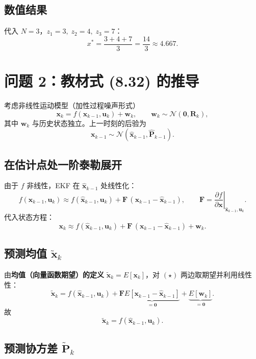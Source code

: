 \documentclass[12pt]{article}
\begin{document}
\subsection*{数值结果}

代入 $N=3$，$z_1=3,\;z_2=4,\;z_3=7$：
\[
\boxed{\;x^{*}=\frac{3+4+7}{3}=\frac{14}{3}\approx 4.667.\;}
\]

\newpage
\section*{问题 2：教材式 (8.32) 的推导}

考虑非线性运动模型（加性过程噪声形式）
\[
\mathbf{x}_k=f(\mathbf{x}_{k-1},\mathbf{u}_k)+\mathbf{w}_k,
\qquad \mathbf{w}_k\sim\mathcal{N}(\mathbf{0},\mathbf{R}_k),
\]
其中 $\mathbf{w}_k$ 与历史状态独立。上一时刻的后验为
\[
\mathbf{x}_{k-1}\sim\mathcal{N}(\hat{\mathbf{x}}_{k-1},\hat{\mathbf{P}}_{k-1}).
\]

\subsection*{在估计点处一阶泰勒展开}

由于 $f$ 非线性，EKF 在 $\hat{\mathbf{x}}_{k-1}$ 处线性化：
\[
f(\mathbf{x}_{k-1},\mathbf{u}_k)\approx
f(\hat{\mathbf{x}}_{k-1},\mathbf{u}_k)
+\mathbf{F}\,(\mathbf{x}_{k-1}-\hat{\mathbf{x}}_{k-1}),
\qquad
\mathbf{F}=\left.\frac{\partial f}{\partial \mathbf{x}}\right|_{\hat{\mathbf{x}}_{k-1},\mathbf{u}_k}.
\]
代入状态方程：
\begin{equation}
\mathbf{x}_k\approx
f(\hat{\mathbf{x}}_{k-1},\mathbf{u}_k)
+\mathbf{F}\,(\mathbf{x}_{k-1}-\hat{\mathbf{x}}_{k-1})
+\mathbf{w}_k.
\tag{$\star$}
\end{equation}

\subsection*{预测均值 $\tilde{\mathbf{x}}_k$}

由\textbf{均值（向量函数期望）的定义} $\tilde{\mathbf{x}}_k=E[\mathbf{x}_k]$，对 $(\star)$ 两边取期望并利用线性性：
\[
\tilde{\mathbf{x}}_k=
f(\hat{\mathbf{x}}_{k-1},\mathbf{u}_k)
+\mathbf{F}\underbrace{E[\mathbf{x}_{k-1}-\hat{\mathbf{x}}_{k-1}]}_{=\mathbf{0}}
+\underbrace{E[\mathbf{w}_k]}_{=\mathbf{0}}.
\]
故
\[
\boxed{\;\tilde{\mathbf{x}}_k=f(\hat{\mathbf{x}}_{k-1},\mathbf{u}_k).\;}
\]

\subsection*{预测协方差 $\tilde{\mathbf{P}}_k$}
\end{document}
